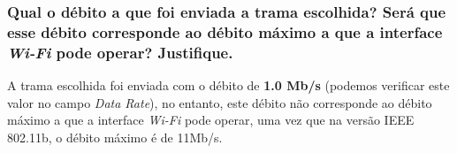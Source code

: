 \vspace{15pt}
\subsubsection{Qual o débito a que foi enviada a trama escolhida? Será que esse débito corresponde ao débito máximo a que a interface \textit{Wi-Fi} pode operar? Justifique.}

    
    
    \par A trama escolhida foi enviada com o débito de \textbf{1.0 Mb/s} (podemos verificar este valor no campo \textit{Data Rate}), no entanto, este débito não corresponde ao débito máximo a que a interface \textit{Wi-Fi} pode operar, uma vez que na versão IEEE 802.11b, o débito máximo é de 11Mb/s.
